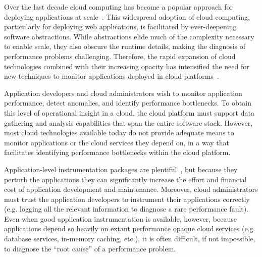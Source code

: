 Over the last decade cloud computing has become a popular approach for
deploying applications at
scale~\cite{Antonopoulos:2010:CCP:1855007,Pinheiro:2014:ACC:2618168.2618188}.
This widespread adoption of cloud computing, particularly for deploying web
applications, is facilitated by ever-deepening software abstractions.  While
abstractions elide much of 
the complexity necessary to enable scale, they also obscure
the runtime details, making the diagnosis of performance
problems challenging.  Therefore, the rapid expansion of cloud technologies
combined with their increasing opacity has intensified the need for new
techniques to monitor applications deployed in cloud
platforms~\cite{DaCunhaRodrigues:2016:MCC:2851613.2851619}. 

Application developers and cloud administrators wish to monitor
application performance, detect anomalies, and identify performance 
bottlenecks. To
obtain this level of operational insight in a cloud,
the cloud platform must support data gathering and analysis capabilities that
span the entire software stack.  However, most cloud technologies
available today do not provide adequate means to monitor applications or the cloud
services they depend on, in a way that facilitates identifying performance bottlenecks
within the cloud platform.

Application-level instrumentation packages are
plentiful~\cite{newrelic,datadog,dynatrace}, but because they perturb the
applications they can significantly increase the
effort and financial cost of application development and maintenance.  Moreover, cloud
administrators must trust the application developers to instrument their
applications correctly (e.g. logging all the relevant 
information to diagnose a rare performance fault).  Even when good application
instrumentation is available, however, because applications depend 
so heavily on extant performance opaque
cloud services (e.g. database services, in-memory caching, etc.),
it is often difficult, if not impossible, to diagnose
the ``root cause'' of a performance problem.


